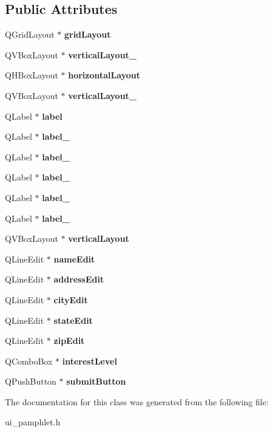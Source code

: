 \subsection*{Public Attributes}
\begin{DoxyCompactItemize}
\item 
\mbox{\label{class_ui___pamphlet_a2a676b1b59c3835dfc2d95193420c947}} 
Q\+Grid\+Layout $\ast$ {\bfseries grid\+Layout}
\item 
\mbox{\label{class_ui___pamphlet_a9ea67d04922b09c591000365e6864d33}} 
Q\+V\+Box\+Layout $\ast$ {\bfseries vertical\+Layout\+\_}
\item 
\mbox{\label{class_ui___pamphlet_a908ec481870a7db978527cd8076e1097}} 
Q\+H\+Box\+Layout $\ast$ {\bfseries horizontal\+Layout}
\item 
\mbox{\label{class_ui___pamphlet_aad299c251be6f4c1ce711384b7cf7712}} 
Q\+V\+Box\+Layout $\ast$ {\bfseries vertical\+Layout\+\_}
\item 
\mbox{\label{class_ui___pamphlet_ab706a9374c58e4d965d4d3585ddcdf43}} 
Q\+Label $\ast$ {\bfseries label}
\item 
\mbox{\label{class_ui___pamphlet_a4aeab7f842a346ea599c74f39fc2e45c}} 
Q\+Label $\ast$ {\bfseries label\+\_}
\item 
\mbox{\label{class_ui___pamphlet_a361651a7789fb71a5e0c3c24adb54f7a}} 
Q\+Label $\ast$ {\bfseries label\+\_}
\item 
\mbox{\label{class_ui___pamphlet_abd79faddb825ae582d41865f175b65be}} 
Q\+Label $\ast$ {\bfseries label\+\_}
\item 
\mbox{\label{class_ui___pamphlet_a87b11e5adb5abec3dd2ba196cf87898f}} 
Q\+Label $\ast$ {\bfseries label\+\_}
\item 
\mbox{\label{class_ui___pamphlet_af54f00564649ea1aebabeb3a36efce60}} 
Q\+Label $\ast$ {\bfseries label\+\_}
\item 
\mbox{\label{class_ui___pamphlet_aad3c9e27d451afe7e925e901b7bfd3a1}} 
Q\+V\+Box\+Layout $\ast$ {\bfseries vertical\+Layout}
\item 
\mbox{\label{class_ui___pamphlet_a23589b6a56f61639ec07a0c621da5a3b}} 
Q\+Line\+Edit $\ast$ {\bfseries name\+Edit}
\item 
\mbox{\label{class_ui___pamphlet_a52bd2a0b278013231fc38098d8305736}} 
Q\+Line\+Edit $\ast$ {\bfseries address\+Edit}
\item 
\mbox{\label{class_ui___pamphlet_a325a7b58b9be000147eb381f6b68923e}} 
Q\+Line\+Edit $\ast$ {\bfseries city\+Edit}
\item 
\mbox{\label{class_ui___pamphlet_a815b6cef0abb7966c1f94c847047d775}} 
Q\+Line\+Edit $\ast$ {\bfseries state\+Edit}
\item 
\mbox{\label{class_ui___pamphlet_a87f1c6c956d998391229ea1a2988220c}} 
Q\+Line\+Edit $\ast$ {\bfseries zip\+Edit}
\item 
\mbox{\label{class_ui___pamphlet_ae5fa8bc104f2603dfd978196380f118c}} 
Q\+Combo\+Box $\ast$ {\bfseries interest\+Level}
\item 
\mbox{\label{class_ui___pamphlet_af4f4203decb3f89e95122df78a842e5c}} 
Q\+Push\+Button $\ast$ {\bfseries submit\+Button}
\end{DoxyCompactItemize}


The documentation for this class was generated from the following file\+:\begin{DoxyCompactItemize}
\item 
ui\+\_\+pamphlet.\+h\end{DoxyCompactItemize}
